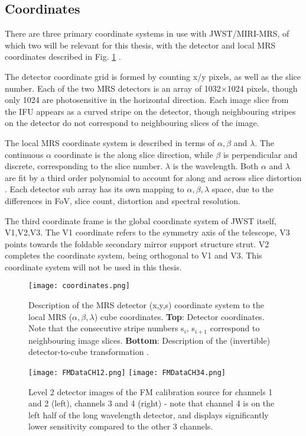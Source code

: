 \subsection{Coordinates}
There are three primary coordinate systems in use with JWST/MIRI-MRS, of which two will be relevant for this thesis, with the detector and local MRS coordinates described in Fig. \ref{fig:mrscoords} \parencite{Argyriou2020}.

The detector coordinate grid is formed by counting x/y pixels, as well as the slice number.
Each of the two MRS detectors is an array of 1032$\times$1024 pixels, though only 1024 are photosensitive in the horizontal direction.
Each image slice from the IFU appears as a curved stripe on the detector, though neighbouring stripes on the detector do not correspond to neighbouring slices of the image. 

The local MRS coordinate system is described in terms of $\alpha,\beta$ and $\lambda$. The continuous $\alpha$ coordinate is the along slice direction, while $\beta$ is perpendicular and discrete, corresponding to the slice number. $\lambda$ is the wavelength. Both $\alpha$ and $\lambda$ are fit by a third order polynomial to account for along and across slice distortion \parencite{MIRI6}. Each detector sub array has its own mapping to $\alpha,\beta,\lambda$ space, due to the differences in FoV, slice count, distortion and spectral resolution.

The third coordinate frame is the global coordinate system of JWST itself, V1,V2,V3. The V1 coordinate refers to the symmetry axis of the telescope, V3 points towards the foldable secondary mirror support structure strut. V2 completes the coordinate system, being orthogonal to V1 and V3. This coordinate system will not be used in this thesis.

\begin{figure}[t]
	\texttt{[image: coordinates.png]}
	\caption{Description of the MRS detector (x,y,s) coordinate system to the local MRS ($\alpha,\beta,\lambda$) cube coordinates. \textbf{Top}: Detector coordinates. Note that the consecutive stripe numbers s$_{i}$, s$_{i+1}$ correspond to neighbouring image slices. \textbf{Bottom}: Description of the (invertible) detector-to-cube transformation \parencite{Argyriou2020}.}
	\label{fig:mrscoords}	
\end{figure}

\begin{figure}[t]
	\centering
	\texttt{[image: FMDataCH12.png]}
	\texttt{[image: FMDataCH34.png]}
	\caption{Level 2 detector images of the FM calibration source for channels 1 and 2 (left), channels 3 and 4 (right) - note that channel 4 is on the left half of the long wavelength detector, and displays significantly lower sensitivity compared to the other 3 channels.}
	\label{fig:flatfield}
\end{figure}
